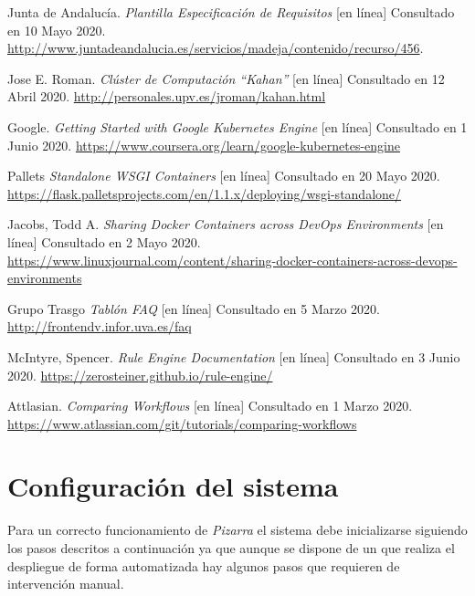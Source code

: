 \documentclass[11pt,spanish,listoffigures,listoftables]{tfgetsinf}
\begin{document}
\begin{thebibliography}{10}
   Junta de Andalucía. \textit{Plantilla Especificación de Requisitos} [en línea]
   \newblock Consultado en 10 Mayo 2020.
   \url{http://www.juntadeandalucia.es/servicios/madeja/contenido/recurso/456}.

	Jose E. Roman. \textit{Clúster de Computación ``Kahan''} [en línea]
	\newblock Consultado en 12 Abril 2020.
	\url{http://personales.upv.es/jroman/kahan.html}
	
	Google. \textit{Getting Started with Google Kubernetes Engine} [en línea]
	\newblock Consultado en 1 Junio 2020.
	\url{https://www.coursera.org/learn/google-kubernetes-engine}
	
	Pallets \textit{Standalone WSGI Containers} [en línea]
	\newblock Consultado en 20 Mayo 2020.
	\url{https://flask.palletsprojects.com/en/1.1.x/deploying/wsgi-standalone/}
	
	Jacobs, Todd A. \textit{Sharing Docker Containers across DevOps Environments} [en línea]
	\newblock Consultado en 2 Mayo 2020.
	\url{https://www.linuxjournal.com/content/sharing-docker-containers-across-devops-environments}
	
	Grupo Trasgo \textit{Tablón FAQ} [en línea]
	\newblock Consultado en 5 Marzo 2020.
	\url{http://frontendv.infor.uva.es/faq}
	
	McIntyre, Spencer. \textit{Rule Engine Documentation} [en línea]
	\newblock Consultado en 3 Junio 2020.
	\url{https://zerosteiner.github.io/rule-engine/}
	
	Attlasian. \textit{Comparing Workflows} [en línea]
	\newblock Consultado en 1 Marzo 2020.
	\url{https://www.atlassian.com/git/tutorials/comparing-workflows}


\end{thebibliography}
\cleardoublepage

\APPENDIX

\chapter{Configuración del sistema}

Para un correcto funcionamiento de \textit{Pizarra} el sistema debe inicializarse siguiendo los pasos descritos a continuación ya que aunque se dispone de un  que realiza el despliegue de forma automatizada hay algunos pasos que requieren de intervención manual.
\end{document}
